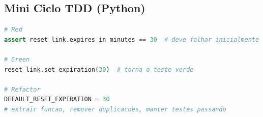 \documentclass{article}
\begin{document}
\subsection*{Mini Ciclo TDD (Python)}
\begin{lstlisting}[language=Python]
# Red
assert reset_link.expires_in_minutes == 30  # deve falhar inicialmente

# Green
reset_link.set_expiration(30)  # torna o teste verde

# Refactor
DEFAULT_RESET_EXPIRATION = 30
# extrair funcao, remover duplicacoes, manter testes passando
\end{lstlisting}
\end{document}
